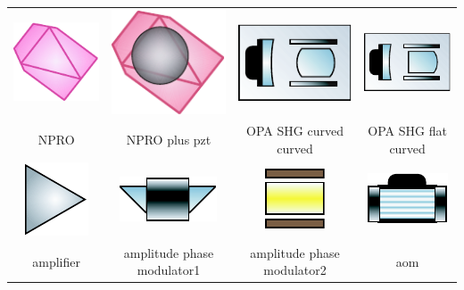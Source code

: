 \begin{table}
\begin{tabular}{|c|c|c|c|}
\hline
\includegraphics{contrib/optics_components/NPRO} & 
\includegraphics{contrib/optics_components/NPRO_plus_pzt} & 
\includegraphics{contrib/optics_components/OPA_SHG_curved_curved} & 
\includegraphics{contrib/optics_components/OPA_SHG_flat_curved}\\
\tiny NPRO & 
\tiny NPRO plus pzt & 
\tiny OPA SHG curved curved & 
\tiny OPA SHG flat curved\\
\hline

\includegraphics{contrib/optics_components/amplifier} & 
\includegraphics{contrib/optics_components/amplitude_phase_modulator1} &
\includegraphics{contrib/optics_components/amplitude_phase_modulator2} & 
\includegraphics{contrib/optics_components/aom}\\
\tiny amplifier & 
\tiny amplitude phase modulator1 &
\tiny amplitude phase modulator2 & 
\tiny aom\\
\hline


\end{tabular}
\end{table}
